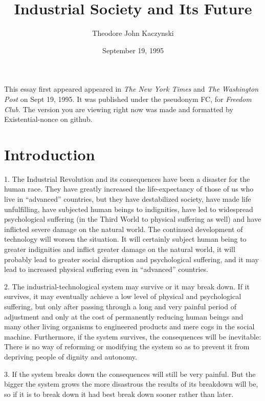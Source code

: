 \documentclass{article}
\title{Industrial Society and Its Future}
\author{\small{Theodore John Kaczynski}}
\date{\small{September 19, 1995}}
\begin{document}
\maketitle
\small{This essay first appeared appeared in \textit{The New York Times} and \textit{The Washington Post} on Sept 19, 1995. It was published under the pseudonym FC, for \textit{Freedom Club.} The version you are viewing right now was made and formatted by Existential-nonce on github.}
\clearpage

\section{Introduction}
\hspace{0.5cm} 1.  The Industrial Revolution and its consequences have been a disaster for the human race.  They have greatly  increased  the  life-expectancy  of  those  of  us  who  live  in  “advanced”  countries, but they  have  destabilized  society,  have  made  life  unfulfilling,  have  subjected  human  beings  to indignities,  have  led  to  widespread  psychological  suffering  (in  the  Third  World  to  physical suffering  as  well)  and  have  inflicted  severe  damage  on  the  natural  world.   The  continued  
development  of  technology  will  worsen  the  situation.   It  will  certainly  subject  human  being to greater indignities and inflict greater damage on the natural world, it will probably lead to greater 
social disruption and psychological suffering, and it may lead to increased physical suffering even 
in “advanced” countries. \vspace{\baselineskip}

2.  The industrial-technological system may survive or it may break down.  If it survives, it may 
eventually  achieve  a  low  level  of  physical  and  psychological  suffering,  but  only  after  passing  through a long and very painful period of adjustment and only at the cost of permanently reducing human beings and many other living organisms to engineered products and mere cogs in the social 
machine.   Furthermore,  if  the  system  survives,  the  consequences  will  be  inevitable:  There  is no  way of reforming or modifying the system so as to prevent it from depriving people of dignity and 
autonomy. \vspace{\baselineskip}

3.  If the system breaks down the consequences will still be very painful.  But the bigger the system 
grows the more disastrous the results of its breakdown will be, so if it is to break down it had best 
break down sooner rather than later. \vspace{\baselineskip}
\end{document}
